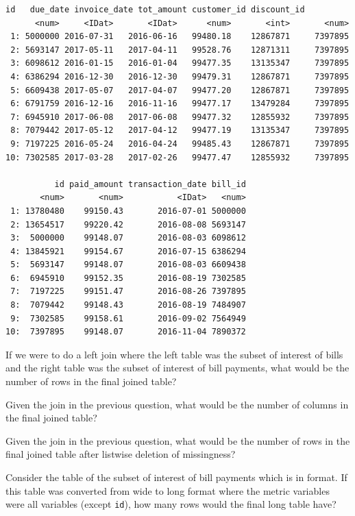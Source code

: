 \documentclass[12pt]{article}
\begin{document}
\begin{Verbatim}[frame=single]
         id   due_date invoice_date tot_amount customer_id discount_id
      <num>     <IDat>       <IDat>      <num>       <int>       <num>
 1: 5000000 2016-07-31   2016-06-16   99480.18    12867871     7397895
 2: 5693147 2017-05-11   2017-04-11   99528.76    12871311     7397895
 3: 6098612 2016-01-15   2016-01-04   99477.35    13135347     7397895
 4: 6386294 2016-12-30   2016-12-30   99479.31    12867871     7397895
 5: 6609438 2017-05-07   2017-04-07   99477.20    12867871     7397895
 6: 6791759 2016-12-16   2016-11-16   99477.17    13479284     7397895
 7: 6945910 2017-06-08   2017-06-08   99477.32    12855932     7397895
 8: 7079442 2017-05-12   2017-04-12   99477.19    13135347     7397895
 9: 7197225 2016-05-24   2016-04-24   99485.43    12867871     7397895
10: 7302585 2017-03-28   2017-02-26   99477.47    12855932     7397895

          id paid_amount transaction_date bill_id
       <num>       <num>           <IDat>   <num>
 1: 13780480    99150.43       2016-07-01 5000000
 2: 13654517    99220.42       2016-08-08 5693147
 3:  5000000    99148.07       2016-08-03 6098612
 4: 13845921    99154.67       2016-07-15 6386294
 5:  5693147    99148.07       2016-08-03 6609438
 6:  6945910    99152.35       2016-08-19 7302585
 7:  7197225    99151.47       2016-08-26 7397895
 8:  7079442    99148.43       2016-08-19 7484907
 9:  7302585    99158.61       2016-09-02 7564949
10:  7397895    99148.07       2016-11-04 7890372
\end{Verbatim}

\benum
{} If we were to do a left join where the left table was the subset of interest of bills and the right table was the subset of interest of bill payments, what would be the number of rows in the final joined table?  

 Given the join in the previous question, what would be the number of columns in the final joined table? 

 Given the join in the previous question, what would be the number of rows in the final joined table after listwise deletion of missingness? 

 Consider the table of the subset of interest of bill payments which is in  format. If this table was converted from wide to long format where the metric variables were all variables (except \texttt{id}), how many rows would the final long table have? 
\end{document}
